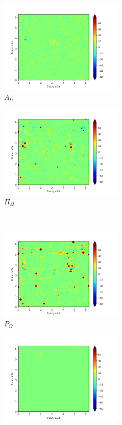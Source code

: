 \begin{figure}[H]
\begin{subfigure}{0.45\textwidth}
        \includegraphics[height=1.75in]{media/run-cds-65/A-enst-1420.png}
        \caption{$A_{\Omega}$}
    \end{subfigure}
    \newline
    \begin{subfigure}{0.45\textwidth}
        \includegraphics[height=1.75in]{media/run-cds-65/Pi-enst-1420.png}
        \caption{$\Pi_{\Omega}$}
    \end{subfigure}
    ~
    \begin{subfigure}{0.45\textwidth}
        \includegraphics[height=1.75in]{media/run-cds-65/P-enst-1420.png}
        \caption{$P_{\Omega}$}
    \end{subfigure}
    \newline
    \begin{subfigure}{0.45\textwidth}
        \includegraphics[height=1.75in]{media/run-cds-65/B-enst-1420.png}

\end{subfigure}
\end{figure}
